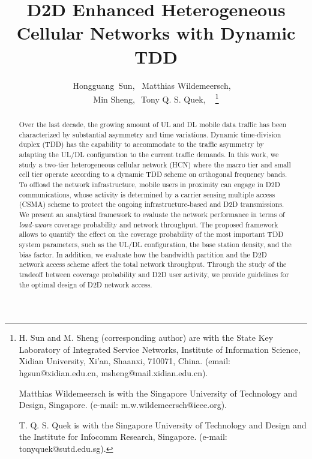 \documentclass[twocolumn,english]{IEEEtran}
\theoremstyle{plain}
\theoremstyle{definition}
\begin{document}
\title{D2D Enhanced Heterogeneous Cellular Networks with Dynamic TDD}


\author{Hongguang~Sun, ~Matthias Wildemeersch,~~\\
Min Sheng,~$\:$Tony Q. S. Quek, ~
\thanks{H. Sun and M. Sheng (corresponding author) are with the State Key
Laboratory of Integrated Service Networks, Institute of Information
Science, Xidian University, Xi'an, Shaanxi, 710071, China. (email:
hgsun@xidian.edu.cn, msheng@mail.xidian.edu.cn).

Matthias Wildemeersch is with the Singapore University of Technology
and Design, Singapore. (e-mail: m.w.wildemeersch@ieee.org).

T. Q. S. Quek is with the Singapore University of Technology and Design
and the Institute for Infocomm Research, Singapore. (e-mail: tonyquek@sutd.edu.sg).}}
\maketitle
\begin{abstract}
Over the last decade, the growing amount of UL and DL mobile data
traffic has been characterized by substantial asymmetry and time variations.
Dynamic time-division duplex (TDD) has the capability to accommodate
to the traffic asymmetry by adapting the UL/DL configuration to the
current traffic demands. In this work, we study a two-tier heterogeneous
cellular network (HCN) where the macro tier and small cell tier operate
according to a dynamic TDD scheme on orthogonal frequency bands. To
offload the network infrastructure, mobile users in proximity can
engage in D2D communications, whose activity is determined by a carrier
sensing multiple access (CSMA) scheme to protect the ongoing infrastructure-based
and D2D transmissions. We present an analytical framework to evaluate
the network performance in terms of \emph{load-aware} coverage probability
and network throughput. The proposed framework allows to quantify
the effect on the coverage probability of the most important TDD system
parameters, such as the UL/DL configuration, the base station density,
and the bias factor. In addition, we evaluate how the bandwidth partition
and the D2D network access scheme affect the total network throughput.
Through the study of the tradeoff between coverage probability and
D2D user activity, we provide guidelines for the optimal design of
D2D network access. \end{abstract}
\end{document}
